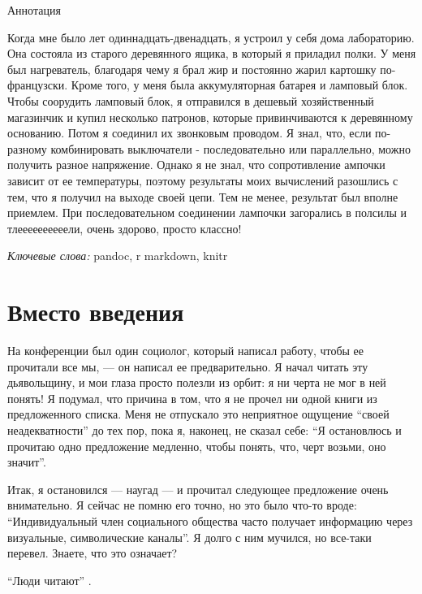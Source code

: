\documentclass[11pt,]{article}
\begin{document}
\doublespacing


\begin{center}Аннотация\end{center}

\noindent Когда мне было лет одиннадцать-двенадцать, я устроил у себя дома
лабораторию. Она состояла из старого деревянного ящика, в который я
приладил полки. У меня был нагреватель, благодаря чему я брал жир и
постоянно жарил картошку по-французски. Кроме того, у меня была
аккумуляторная батарея и ламповый блок. Чтобы соорудить ламповый блок, я
отправился в дешевый хозяйственный магазинчик и купил несколько
патронов, которые привинчиваются к деревянному основанию. Потом я
соединил их звонковым проводом. Я знал, что, если по-разному
комбинировать выключатели - последовательно или параллельно, можно
получить разное напряжение. Однако я не знал, что сопротивление ампочки
зависит от ее температуры, поэтому результаты моих вычислений разошлись
с тем, что я получил на выходе своей цепи. Тем не менее, результат был
вполне приемлем. При последовательном соединении лампочки загорались в
полсилы и тлеееееееееели, очень здорово, просто классно!

\emph{Ключевые слова:} pandoc, r markdown, knitr


\newpage

\section{Вместо введения}\label{-}

На конференции был один социолог, который написал работу, чтобы ее
прочитали все мы, --- он написал ее предварительно. Я начал читать эту
дьявольщину, и мои глаза просто полезли из орбит: я ни черта не мог в
ней понять! Я подумал, что причина в том, что я не прочел ни одной книги
из предложенного списка. Меня не отпускало это неприятное ощущение
``своей неадекватности'' до тех пор, пока я, наконец, не сказал себе:
``Я остановлюсь и прочитаю одно предложение медленно, чтобы понять, что,
черт возьми, оно значит''.

Итак, я остановился --- наугад --- и прочитал следующее предложение
очень внимательно. Я сейчас не помню его точно, но это было что-то
вроде: ``Индивидуальный член социального общества часто получает
информацию через визуальные, символические каналы''. Я долго с ним
мучился, но все-таки перевел. Знаете, что это означает?

``Люди читают'' \citep{Feynman:1949:TP, Feynman:1949:STA}.
\end{document}
